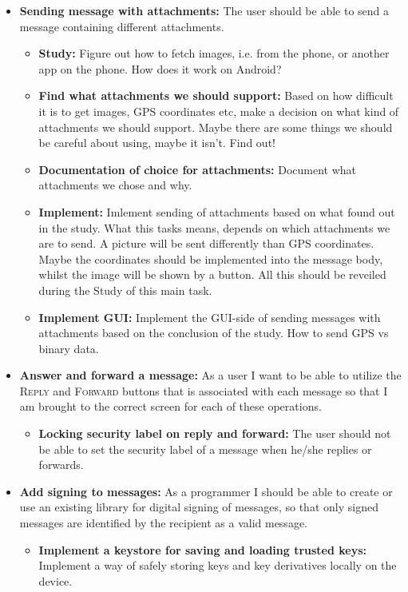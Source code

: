 \begin{itemize}
\begin{itemize}
\end{itemize}
\item{}\textbf{Sending message with attachments:} The user should be able to send a message containing different attachments.
\begin{itemize}
\item{}\textbf{Study:} Figure out how to fetch images, i.e. from the phone, or another app on the phone. How does it work on Android?
\item{}\textbf{Find what attachments we should support:} Based on how difficult it is to get images, GPS coordinates etc, make a decision on what kind of attachments we should support. Maybe there are some things we should be careful about using, maybe it isn't. Find out!
\item{}\textbf{Documentation of choice for attachments:} Document what attachments we chose and why.
\item{}\textbf{Implement:} Imlement sending of attachments based on what found out in the study. What this tasks means, depends on which attachments we are to send. A picture will be sent differently than GPS coordinates. Maybe the coordinates should be implemented into the message body, whilst the image will be shown by a button. All this should be reveiled during the Study of this main task. 
\item{}\textbf{Implement GUI:} Implement the GUI-side of sending messages with attachments based on the conclusion of the study. How to send GPS vs binary data.
\end{itemize}
\item{}\textbf{Answer and forward a message:} As a user I want to be able to utilize the \textsc{Reply} and \textsc{Forward} buttons that is associated with each message so that I am brought to the correct screen for each of these operations.
\begin{itemize}
\item{}\textbf{Locking security label on reply and forward:} The user should not be able to set the security label of a message when he/she replies or forwards.
\end{itemize}
\item{}\textbf{Add signing to messages:} As a programmer I should be able to create or use an existing library for digital signing of messages, so that only signed messages are identified by the recipient as a valid message.
\begin{itemize}
\item{}\textbf{Implement a keystore for saving and loading trusted keys:} Implement a way of safely storing keys and key derivatives locally on the device. 

\end{itemize}
\end{itemize}
